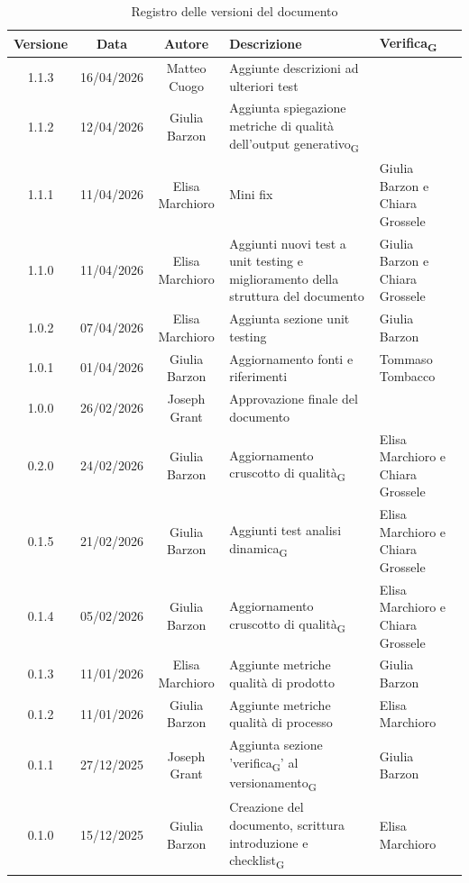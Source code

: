 \documentclass[11pt,a4paper]{article}
\newcommand{\gls}[1]{#1\textsubscript{G}}
\begin{document}
\begin{table}[H]
    \centering
    \begin{tabular}{|c|c|c|>{\raggedright\arraybackslash}p{}|p{}|}
        \hline
        \textbf{Versione} & \textbf{Data} & \textbf{Autore} & \textbf{Descrizione} & \textbf{\gls{Verifica}} \\
        \hline
        1.1.3 & 16/04/2026 & Matteo Cuogo & Aggiunte descrizioni ad ulteriori test & \\
        \hline
        1.1.2 & 12/04/2026 & Giulia Barzon & Aggiunta spiegazione metriche di \gls{qualità dell'output generativo} & \\
        \hline
        1.1.1 & 11/04/2026 & Elisa Marchioro & Mini fix & Giulia Barzon e Chiara Grossele\\
        \hline
        1.1.0 & 11/04/2026 & Elisa Marchioro & Aggiunti nuovi test a unit testing e miglioramento della struttura del documento & Giulia Barzon e Chiara Grossele\\
        \hline
        1.0.2 & 07/04/2026 & Elisa Marchioro & Aggiunta sezione unit testing & Giulia Barzon\\
        \hline
        1.0.1 & 01/04/2026 & Giulia Barzon & Aggiornamento fonti e riferimenti & Tommaso Tombacco \\
        \hline
        1.0.0 & 26/02/2026 & Joseph Grant & Approvazione finale del documento &  \\
        \hline
        0.2.0 & 24/02/2026 & Giulia Barzon & Aggiornamento \gls{cruscotto di qualità} & Elisa Marchioro e Chiara Grossele\\
        \hline
        0.1.5 & 21/02/2026 & Giulia Barzon & Aggiunti test \gls{analisi dinamica} & Elisa Marchioro e Chiara Grossele\\
        \hline
        0.1.4 & 05/02/2026 & Giulia Barzon & Aggiornamento \gls{cruscotto di qualità} & Elisa Marchioro e Chiara Grossele\\
        \hline
        0.1.3 & 11/01/2026 & Elisa Marchioro & Aggiunte metriche qualità di prodotto & Giulia Barzon \\
        \hline
        0.1.2 & 11/01/2026 & Giulia Barzon & Aggiunte metriche qualità di processo & Elisa Marchioro\\
        \hline
        0.1.1 & 27/12/2025 & Joseph Grant & Aggiunta sezione '\gls{verifica}' al \gls{versionamento} & Giulia Barzon\\
        \hline
        0.1.0 & 15/12/2025 & Giulia Barzon & Creazione del documento, scrittura introduzione e \gls{checklist} & Elisa Marchioro\\
        \hline
    \end{tabular}
    \caption{Registro delle versioni del documento}
    \label{tab:versionamento}
\end{table}
\end{document}
